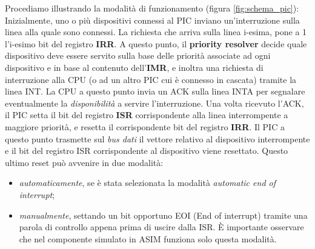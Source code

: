 Procediamo illustrando la modalità di funzionamento (figura \ref{fig:schema_pic}):
Inizialmente, uno o più dispositivi connessi al PIC inviano un'interruzione sulla linea alla quale sono connessi. La richiesta che arriva sulla linea i-esima, pone a 1 l'i-esimo bit del registro \textbf{IRR}. A questo punto, il \textbf{priority resolver} decide quale dispositivo deve essere servito sulla base delle priorità associate ad ogni dispositivo e in base al contenuto dell'\textbf{IMR}, e inoltra una richiesta di interruzione alla CPU (o ad un altro PIC cui è connesso in cascata) tramite la linea INT. La CPU a questo punto invia un ACK sulla linea INTA per segnalare eventualmente la \textit{disponibilità} a servire l'interruzione. 
Una volta ricevuto l'ACK, il PIC setta il bit del registro \textbf{ISR} corrispondente alla linea interrompente a maggiore priorità, e resetta il corrispondente bit del registro \textbf{IRR}. Il PIC a questo punto trasmette sul \textit{bus dati} il vettore relativo al dispositivo interrompente e il bit del registro ISR corrispondente al dispositivo viene resettato. Questo ultimo reset può avvenire in due modalità:
\begin{itemize}
    \item \textit{automaticamente}, se è stata selezionata la modalità \textit{automatic end of interrupt};
    \item \textit{manualmente}, settando un bit opportuno EOI (End of interrupt) tramite una parola di controllo appena prima di uscire dalla ISR. \uppercase{è} importante osservare che nel componente simulato in ASIM funziona solo questa modalità.
\end{itemize}

